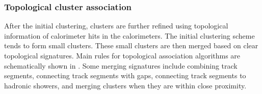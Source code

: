 \subsubsection{Topological cluster association}

After the initial clustering, clusters are further refined using topological information of calorimeter hits in the calorimeters. The initial clustering scheme tends to form small clusters. These small clusters are then merged  based on clear topological signatures. Main rules for topological association algorithms  are schematically shown in . Some merging signatures include combining track segments, connecting track segments with gaps, connecting track segments to hadronic showers, and merging clusters when they are within close proximity.
